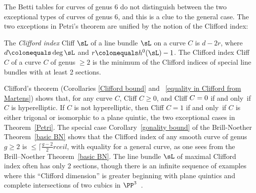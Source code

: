 The Betti tables for curves of genus 6
do not distinguish between the two exceptional types of 
curves of genus 6, and this is a clue to the general case.
The two exceptions in Petri's theorem are unified  by  the 
notion of the
%
Clifford index:

\begin{definition}
The \emph{Clifford index} Cliff $\sL$ of a line bundle $\sL$ on a curve
%
$C$ is $d-2r$, where $d \colonequals  \deg \sL$ and $r \colonequals
h^0(\sL)-1$. The Clifford index Cliff $C$ of
a curve $C$ of genus $\geq 2$ is the minimum of the Clifford indices
of special line bundles with at least 2 sections.
\unif
\end{definition}

Clifford's theorem (Corollaries \ref{Clifford bound} and ~\ref{equality
in Clifford from Martens}) shows that, for any curve $C$,
 Cliff $C \geq 0$, and Cliff $C =
\index{Clifford's theorem}%
0$ if and only~if $C$ is hyperelliptic. If $C$ is not hyperelliptic, then
 Cliff $C=1$ if and only~if $C$ is either trigonal or
isomorphic to a plane quintic, the two exceptional cases in Theorem~\ref{Petri}.
 The special case Corollary~\ref{gonality bound} of the Brill-Noether Theorem~\ref{basic BN} 
 shows
 that the Clifford index of any smooth curve of
genus $g\geq 2$ is $\leq \lceil \frac{g-2}{2} rceil$, with equality for a general
curve, as one sees from the Brill--Noether Theorem~\ref{basic BN}. The line bundle $\sL$ of maximal Clifford index often has only
2 sections, though there is an infinite sequence of examples where this
``Clifford dimension'' is greater beginning with plane quintics
and complete intersections of two cubics in $\PP^{3}$~\cite{MR1030141}.


